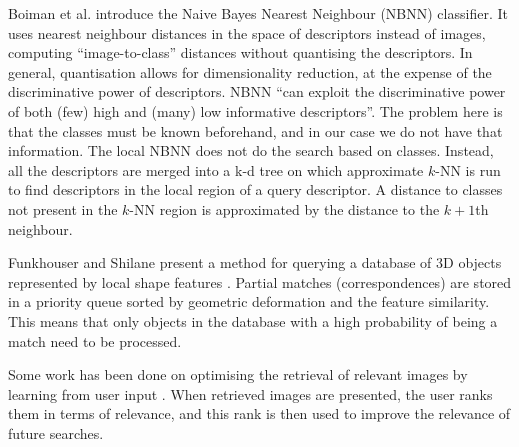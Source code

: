 \documentclass[11pt,a4paper]{kth-mag}
\begin{document}
Boiman et al. \cite{boiman2008defense} introduce the Naive Bayes Nearest
Neighbour (NBNN) classifier. It uses nearest neighbour distances in the space of
descriptors instead of images, computing ``image-to-class'' distances without
quantising the descriptors. In general, quantisation allows for dimensionality
reduction, at the expense of the discriminative power of descriptors. NBNN ``can
exploit the discriminative power of both (few) high and (many) low informative
descriptors''. The problem here is that the classes must be known beforehand,
and in our case we do not have that information. The local NBNN
\cite{mccann2012local} does not do the search based on classes. Instead, all the
descriptors are merged into a k-d tree on which approximate $k$-NN is run to
find descriptors in the local region of a query descriptor. A distance to
classes not present in the $k$-NN region is approximated by the distance to the
$k+1$th neighbour.

Funkhouser and Shilane present a method for querying a database of 3D objects
represented by local shape features \cite{funkhouser2006partial}. Partial
matches (correspondences) are stored in a priority queue sorted by geometric
deformation and the feature similarity. This means that only objects in the
database with a high probability of being a match need to be processed.

Some work has been done on optimising the retrieval of relevant images by
learning from user input \cite{rui2000optimizing}. When retrieved images are
presented, the user ranks them in terms of relevance, and this rank is then used
to improve the relevance of future searches.
\end{document}
